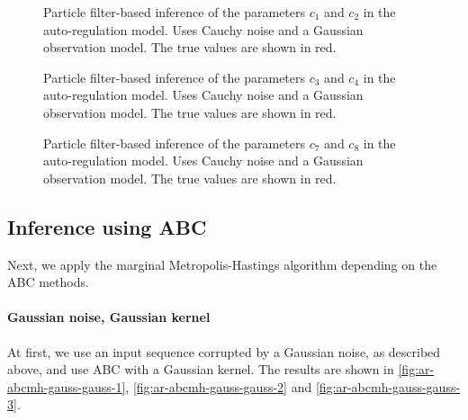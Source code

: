 \begin{figure}[htp]%
    \centering
    \qquad
    \caption{Particle filter-based inference of the parameters $c_1$ and $c_2$ in the auto-regulation model. Uses Cauchy noise and a Gaussian observation model. The true values are shown in red.}%
    \label{fig:ar-pmh-cauchy-1}%
\end{figure}

\begin{figure}[htp]%
    \centering
    \qquad
    \caption{Particle filter-based inference of the parameters $c_3$ and $c_4$ in the auto-regulation model. Uses Cauchy noise and a Gaussian observation model. The true values are shown in red.}%
    \label{fig:ar-pmh-cauchy-2}%
\end{figure}

\begin{figure}[htp]%
    \centering
    \qquad
    \caption{Particle filter-based inference of the parameters $c_7$ and $c_8$ in the auto-regulation model. Uses Cauchy noise and a Gaussian observation model. The true values are shown in red.}%
    \label{fig:ar-pmh-cauchy-3}%
\end{figure}


\subsection{Inference using ABC}
Next, we apply the marginal Metropolis-Hastings algorithm depending on the ABC methods.

\paragraph{Gaussian noise, Gaussian kernel}
At first, we use an input sequence corrupted by a Gaussian noise, as described above, and use ABC with a Gaussian kernel. The results are shown in \autoref{fig:ar-abcmh-gauss-gauss-1}, \autoref{fig:ar-abcmh-gauss-gauss-2} and \autoref{fig:ar-abcmh-gauss-gauss-3}.

